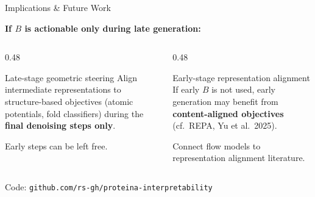 \documentclass[10pt, aspectratio=169]{beamer}
\begin{document}
\begin{frame}{Implications \& Future Work}

\textbf{If $B$ is actionable only during late generation:}

\vfill

\begin{columns}[T]
\begin{column}{0.48\textwidth}
\begin{block}{Late-stage geometric steering}
Align intermediate representations to structure-based objectives (atomic potentials, fold classifiers) during the \textbf{final denoising steps only}.

Early steps can be left free.
\end{block}
\end{column}

\begin{column}{0.48\textwidth}
\begin{block}{Early-stage representation alignment}
If early $B$ is not used, early generation may benefit from \textbf{content-aligned objectives} (cf.\ REPA, Yu et al.\ 2025).

Connect flow models to representation alignment literature.
\end{block}
\end{column}
\end{columns}

\vfill

\centering
Code: \texttt{github.com/rs-gh/proteina-interpretability}

\end{frame}
\end{document}

